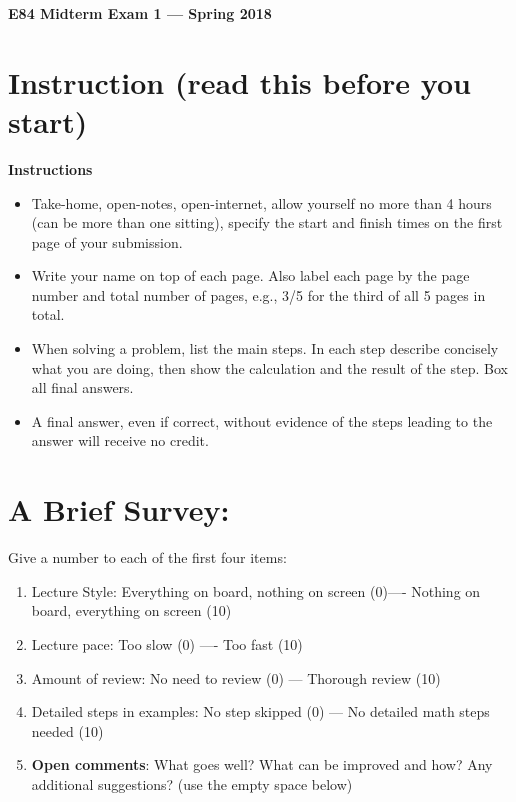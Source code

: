 \usepackage{html}


\begin{center}
{\Large \bf  E84 Midterm Exam 1 --- Spring 2018}
\end{center}

\section*{Instruction (read this before you start)}

{\bf Instructions}
\begin{itemize}
\item Take-home, open-notes, open-internet, allow yourself no more
  than 4 hours (can be more than one sitting), specify the start 
  and finish times on the first page of your submission.

\item Write your name on top of each page. Also label each page by
  the page number and total number of pages, e.g., 3/5 for the third
  of all 5 pages in total.

\item When solving a problem, list the main steps. In each step describe 
  concisely what you are doing, then show the calculation and the 
  result of the step. Box all final answers. 

\item A final answer, even if correct, without evidence of the steps 
  leading to the answer will receive no credit. 

\end{itemize}


\section*{A Brief Survey:} 

Give a number to each of the first four items:
\begin{enumerate}
\item Lecture Style: Everything on board, nothing on screen (0)---- 
  Nothing on board, everything on screen (10)

\item Lecture pace: Too slow (0) ---- Too fast (10)

\item Amount of review: No need to review (0) --- Thorough review (10)

\item Detailed steps in examples: No step skipped (0) --- 
  No detailed math steps needed (10)

\item {\bf Open comments}: What goes well? What can be improved and how? 
  Any additional suggestions? (use the empty space below)
\end{enumerate}

